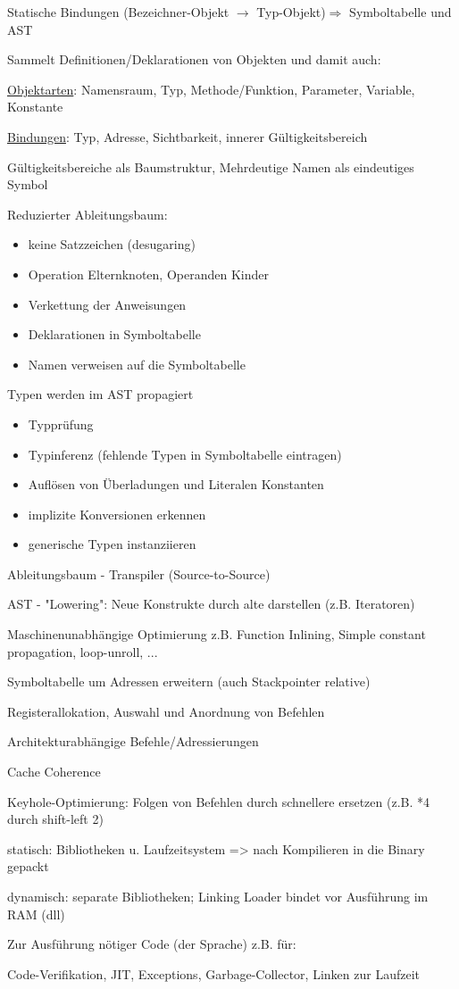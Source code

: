 \newpage
{}
Statische Bindungen (Bezeichner-Objekt $\rightarrow$ Typ-Objekt)$\Rightarrow$ Symboltabelle und AST

 Sammelt Definitionen/Deklarationen von Objekten und damit auch:

\underline{Objektarten}: Namensraum, Typ, Methode/Funktion, Parameter, Variable, Konstante

\underline{Bindungen}: Typ, Adresse, Sichtbarkeit, innerer Gültigkeitsbereich

Gültigkeitsbereiche als Baumstruktur, Mehrdeutige Namen als eindeutiges Symbol


Reduzierter Ableitungsbaum: 
\begin{itemize}
	\item keine Satzzeichen (desugaring)
	\item Operation Elternknoten, Operanden Kinder
	\item Verkettung der Anweisungen
	\item Deklarationen in Symboltabelle
	\item Namen verweisen auf die Symboltabelle
\end{itemize}

Typen werden im AST propagiert 
\begin{itemize}
\item Typprüfung
\item Typinferenz (fehlende Typen in Symboltabelle eintragen)
\item Auflösen von Überladungen und Literalen Konstanten
\item implizite Konversionen erkennen
\item generische Typen instanziieren
\end{itemize}



Ableitungsbaum - Transpiler (Source-to-Source)

AST - "Lowering": Neue Konstrukte durch alte darstellen (z.B. Iteratoren)

Maschinenunabhängige Optimierung z.B. Function Inlining, Simple constant propagation, loop-unroll, ...



Symboltabelle um Adressen erweitern (auch Stackpointer relative)

Registerallokation, Auswahl und Anordnung von Befehlen

Architekturabhängige Befehle/Adressierungen

Cache Coherence

Keyhole-Optimierung: Folgen von Befehlen durch schnellere ersetzen (z.B. *4 durch shift-left 2)

statisch: Bibliotheken u. Laufzeitsystem => nach Kompilieren in die Binary gepackt

dynamisch: separate Bibliotheken; Linking Loader bindet vor Ausführung im RAM (dll)

Zur Ausführung nötiger Code (der Sprache) z.B. für:

Code-Verifikation, JIT, Exceptions, Garbage-Collector, Linken zur Laufzeit

